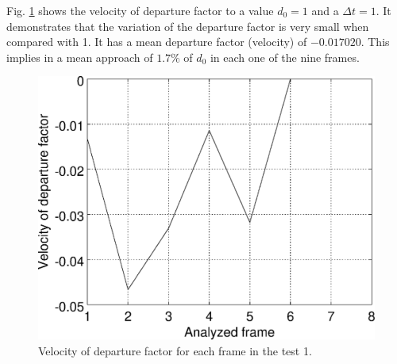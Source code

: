 Fig. \ref{fig:res_graph1v} shows the velocity of departure factor
to a value $d_0=1$ and a $\Delta t=1$. It demonstrates that the variation
of the departure factor is very small when compared with 1. 
It has a mean departure factor (velocity) of $-0.017020$. This implies in a mean approach of $1.7\%$ of $d_0$
in each one of the nine frames.
\begin{figure}[!hbt]
\centering
\includegraphics[width=0.8\columnwidth]{images/graph1v.eps}
\caption{Velocity of departure factor for each frame in the test 1.}
\label{fig:res_graph1v}
\end{figure}
